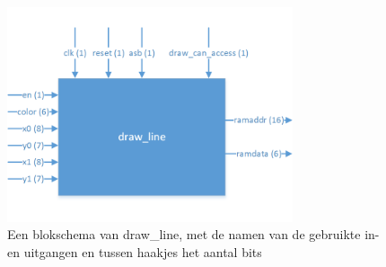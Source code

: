 \documentclass{scrartcl} %
\begin{document}
\begin{figure}[H]
	\centering
	\includegraphics[width=0.75\textwidth]{resource/draw_line.png}
	\caption{Een blokschema van draw\_line, met de namen van de gebruikte in- en uitgangen en tussen haakjes het aantal bits}
	\label{fig:decoder-schema}
\end{figure}
\end{document}

